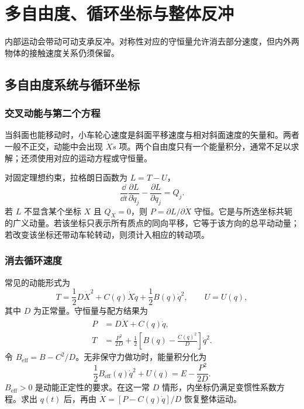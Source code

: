 \section{多自由度、循环坐标与整体反冲}

内部运动会带动可动支承反冲。对称性对应的守恒量允许消去部分速度，但内外两物体的接触速度关系仍须保留。



\subsection{多自由度系统与循环坐标}
\subsubsection{交叉动能与第二个方程}
当斜面也能移动时，小车轮心速度是斜面平移速度与相对斜面速度的矢量和。两者一般不正交，动能中会出现 $\dot X\dot s$ 项。两个自由度只有一个能量积分，通常不足以求解；还须使用对应的运动方程或守恒量。

对固定理想约束，拉格朗日函数为 $L=T-U$，
\begin{equation}\label{sup1:eq:d1-lagrange}
\frac{\dd}{\dd t}\frac{\partial L}{\partial\dot q_j}
-\frac{\partial L}{\partial q_j}=Q_j.
\end{equation}
若 $L$ 不显含某个坐标 $X$ 且 $Q_X=0$，则 $P=\partial L/\partial\dot X$ 守恒。它是与所选坐标共轭的广义动量。若该坐标只表示所有质点的同向平移，它等于该方向的总平动动量；若改变该坐标还带动车轮转动，则须计入相应的转动项。

\subsubsection{消去循环速度}
常见的动能形式为
\[
T=\frac12D\dot X^2+C(q)\dot X\dot q+\frac12B(q)\dot q^2,
\qquad U=U(q),
\]
其中 $D$ 为正常量。守恒量与配方结果为
\begin{align*}
P&=D\dot X+C(q)\dot q,\\
T&=\frac{P^2}{2D}+\frac12\left[B(q)-\frac{C(q)^2}{D}\right]\dot q^2.
\end{align*}
令 $B_{\text{eff}}=B-C^2/D$。无非保守力做功时，能量积分化为
\begin{equation}\label{sup1:eq:d1-reduced}
\frac12B_{\text{eff}}(q)\dot q^2+U(q)
=E-\frac{P^2}{2D}.
\end{equation}
$B_{\text{eff}}>0$ 是动能正定性的要求。在这一常 $D$ 情形，内坐标仍满足变惯性系数方程。求出 $q(t)$ 后，再由 $\dot X=[P-C(q)\dot q]/D$ 恢复整体运动。

